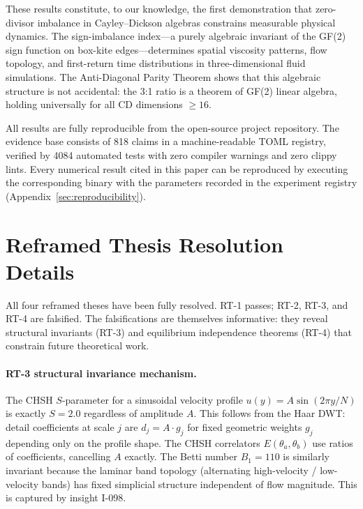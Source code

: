 \documentclass[12pt]{article}
\theoremstyle{definition}
\theoremstyle{plain}
\theoremstyle{remark}
\begin{document}
These results constitute, to our knowledge, the first demonstration that
zero-divisor imbalance in Cayley--Dickson algebras constrains measurable
physical dynamics.  The sign-imbalance index---a purely algebraic invariant of
the GF(2) sign function on box-kite edges---determines spatial viscosity
patterns, flow topology, and first-return time distributions in three-dimensional fluid
simulations.  The Anti-Diagonal Parity Theorem shows that this algebraic
structure is not accidental: the 3:1 ratio is a theorem of GF(2) linear
algebra, holding universally for all CD dimensions $\geq 16$.

All results are fully reproducible from the open-source project repository.
The evidence base consists of 818 claims in a machine-readable TOML
registry, verified by 4084 automated tests with zero compiler warnings and
zero clippy lints.  Every numerical result cited in this paper can be
reproduced by executing the corresponding binary with the parameters
recorded in the experiment registry (Appendix~\ref{sec:reproducibility}).

\appendix

\section{Reframed Thesis Resolution Details}
\label{sec:reframed-rt-details}

All four reframed theses have been fully resolved.  RT-1 passes; RT-2,
RT-3, and RT-4 are falsified.  The falsifications are themselves
informative: they reveal structural invariants (RT-3) and equilibrium
independence theorems (RT-4) that constrain future theoretical work.

\paragraph{RT-3 structural invariance mechanism.}
The CHSH $S$-parameter for a sinusoidal velocity profile
$u(y) = A \sin(2\pi y / N)$ is exactly $S = 2.0$ regardless of amplitude
$A$.  This follows from the Haar DWT: detail coefficients at scale $j$
are $d_j = A \cdot g_j$ for fixed geometric weights $g_j$ depending only
on the profile shape.  The CHSH correlators $E(\theta_a, \theta_b)$ use
ratios of coefficients, cancelling $A$ exactly.  The Betti number
$B_1 = 110$ is similarly invariant because the laminar band topology
(alternating high-velocity / low-velocity bands) has fixed simplicial
structure independent of flow magnitude.  This is captured by insight
I-098.
\end{document}
